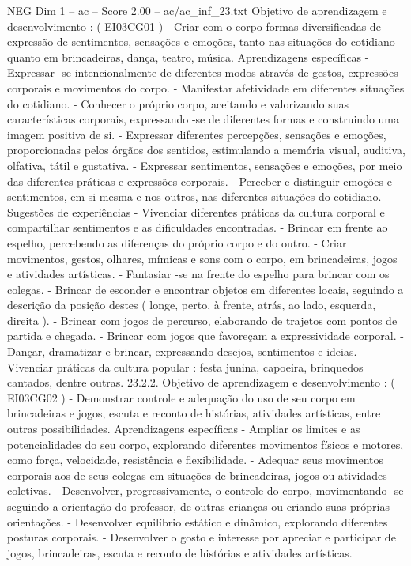 \begin{textsample}{NEG Dim 1 – ac – Score 2.00 – ac/ac\_inf\_23.txt}
Objetivo de aprendizagem e desenvolvimento : ( EI03CG01 ) - Criar com o corpo formas diversificadas de expressão de sentimentos, sensações e emoções, tanto nas situações do cotidiano quanto em brincadeiras, dança, teatro, música.
Aprendizagens específicas - Expressar -se intencionalmente de diferentes modos através de gestos, expressões corporais e movimentos do corpo. - Manifestar afetividade em diferentes situações do cotidiano. - Conhecer o próprio corpo, aceitando e valorizando suas características corporais, expressando -se de diferentes formas e construindo uma imagem positiva de si. - Expressar diferentes percepções, sensações e emoções, proporcionadas pelos órgãos dos sentidos, estimulando a memória visual, auditiva, olfativa, tátil e gustativa. - Expressar sentimentos, sensações e emoções, por meio das diferentes práticas e expressões corporais. - Perceber e distinguir emoções e sentimentos, em si mesma e nos outros, nas diferentes situações do cotidiano.
Sugestões de experiências - Vivenciar diferentes práticas da cultura corporal e compartilhar sentimentos e as dificuldades encontradas. - Brincar em frente ao espelho, percebendo as diferenças do próprio corpo e do outro. - Criar movimentos, gestos, olhares, mímicas e sons com o corpo, em brincadeiras, jogos e atividades artísticas. - Fantasiar -se na frente do espelho para brincar com os colegas. - Brincar de esconder e encontrar objetos em diferentes locais, seguindo a descrição da posição destes ( longe, perto, à frente, atrás, ao lado, esquerda, direita ). - Brincar com jogos de percurso, elaborando de trajetos com pontos de partida e chegada. - Brincar com jogos que favoreçam a expressividade corporal. - Dançar, dramatizar e brincar, expressando desejos, sentimentos e ideias. - Vivenciar práticas da cultura popular : festa junina, capoeira, brinquedos cantados, dentre outras. 23.2.2.
Objetivo de aprendizagem e desenvolvimento : ( EI03CG02 ) - Demonstrar controle e adequação do uso de seu corpo em brincadeiras e jogos, escuta e reconto de histórias, atividades artísticas, entre outras possibilidades.
Aprendizagens específicas - Ampliar os limites e as potencialidades do seu corpo, explorando diferentes movimentos físicos e motores, como força, velocidade, resistência e flexibilidade. - Adequar seus movimentos corporais aos de seus colegas em situações de brincadeiras, jogos ou atividades coletivas. - Desenvolver, progressivamente, o controle do corpo, movimentando -se seguindo a orientação do professor, de outras crianças ou criando suas próprias orientações. - Desenvolver equilíbrio estático e dinâmico, explorando diferentes posturas corporais. - Desenvolver o gosto e interesse por apreciar e participar de jogos, brincadeiras, escuta e reconto de histórias e atividades artísticas.

\end{textsample}
